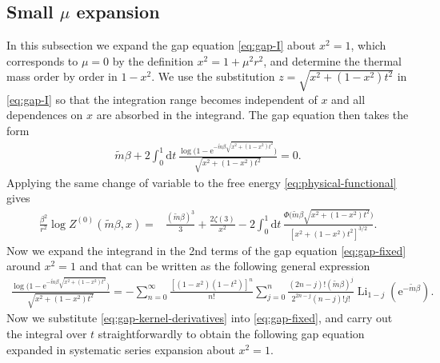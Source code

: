 \documentclass[a4paper,11pt]{article}
\newcommand{\e}{\mathrm e}
\newcommand{\dd}{\mathrm d}
\newcommand{\Li}{\operatorname{Li}}
\begin{document}
\subsection{Small $\mu$ expansion}
\label{subsec:small-mu}
In this subsection we expand the gap equation \eqref{eq:gap-I} about
$x^2=1$, which corresponds to $\mu=0$ by the definition
$x^2=1+\mu^2r^2$, and determine the thermal mass order by order in
$1-x^2$.  We use the substitution
$z=\sqrt{x^2+(1-x^2)t^2}$ in \eqref{eq:gap-I} so that the integration range becomes independent of $x$
and  all dependences on $x$ are absorbed in the integrand.  The gap equation then
takes the form
\begin{align}
\tilde m\beta+2\int_0^1\dd t\,
 \frac{\log \bigl(1-\e^{-\tilde m\beta
 \sqrt{x^2+(1-x^2)t^2}}\bigr)}
 {\sqrt{x^2+(1-x^2)t^2}}=0.
 \label{eq:gap-fixed}
\end{align}
Applying the same change of variable to the free energy
\eqref{eq:physical-functional} gives
\begin{align}
 \frac{\beta^2}{r^2}\log Z^{(0)}(\tilde m\beta,x)
 ={}&\frac{\left(\tilde m\beta\right)^3}{3}+\frac{2\zeta(3)}{x^2}
 -2\int_0^1\dd t\,
 \frac{\Phi\big(\tilde m\beta\sqrt{x^2+(1-x^2)t^2}\big)}
 {[x^2+(1-x^2)t^2]^{3/2}}.
 \label{eq:F-fixed}
\end{align}
Now we expand the integrand in the 2nd terms of the gap equation \eqref{eq:gap-fixed} around $x^2=1$ and that can be written as the following general expression
%
\begin{align}
 \frac{\log\bigl(1-\e^{-\tilde m\beta
 \sqrt{x^2+(1-x^2)t^2}}\bigr)}
 {\sqrt{x^2+(1-x^2)t^2}}
 =-\sum_{n=0}^{\infty}
 \frac{[(1-x^2)(1-t^2)]^n}{n!}
 \sum_{j=0}^{n}
 \frac{(2n-j)!(\tilde m\beta)^j}{2^{2n-j}(n-j)!j!}
 \Li_{1-j}(\e^{-\tilde m\beta}).
 \label{eq:gap-kernel-derivatives}
\end{align}
Now we substitute \eqref{eq:gap-kernel-derivatives} into \eqref{eq:gap-fixed}, and carry out the integral over $t$ straightforwardly to obtain the following gap equation expanded in systematic series expansion about $x^2=1$.
\end{document}
